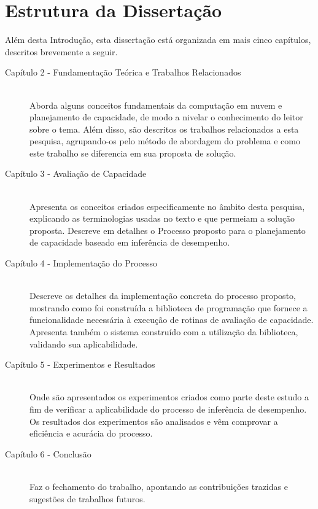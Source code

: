\section{Estrutura da Dissertação}
Além desta Introdução, esta dissertação está organizada em mais cinco capítulos, 
descritos brevemente a seguir.

\begin{description}
  \item[Capítulo 2 - Fundamentação Teórica e Trabalhos Relacionados] \hfill \\
  Aborda alguns conceitos fundamentais da computação em nuvem e planejamento de
  capacidade, de modo a nivelar o conhecimento do leitor sobre o tema. Além disso, 
  são descritos os trabalhos relacionados a esta pesquisa, agrupando-os pelo método 
  de abordagem do problema e como este trabalho se diferencia em sua proposta de 
  solução.
  \item[Capítulo 3 - Avaliação de Capacidade] \hfill \\
  Apresenta os conceitos criados especificamente no âmbito desta pesquisa, explicando 
  as terminologias usadas no texto e que permeiam a solução proposta. Descreve em 
  detalhes o Processo proposto para o planejamento de capacidade baseado em
  inferência de desempenho.
  \item[Capítulo 4 - Implementação do Processo] \hfill \\
  Descreve os detalhes da implementação concreta do processo proposto, mostrando
  como foi construída a biblioteca de programação que fornece a funcionalidade
  necessária à execução de rotinas de avaliação de capacidade. Apresenta também
  o sistema construído com a utilização da biblioteca, validando sua 
  aplicabilidade. 
  \item[Capítulo 5 - Experimentos e Resultados] \hfill \\
  Onde são apresentados os experimentos criados como parte deste estudo a fim de
  verificar a aplicabilidade do processo de inferência de desempenho. Os resultados 
  dos experimentos são analisados e vêm comprovar a eficiência e acurácia do 
  processo. 
  \item[Capítulo 6 - Conclusão] \hfill \\
  Faz o fechamento do trabalho, apontando as contribuições trazidas e sugestões
  de trabalhos futuros. 
\end{description}

